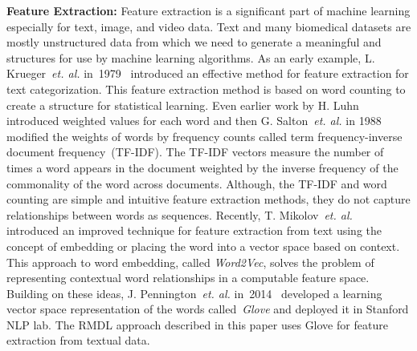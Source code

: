 \documentclass[sigconf, final]{acmart}
\begin{document}
\textbf{Feature Extraction:}\label{subsec:related1}
Feature extraction is a significant part of machine learning especially for text, image, and video data. %
 Text and many biomedical datasets are mostly unstructured data from which we need to generate a meaningful and structures for use by machine learning algorithms. As an early example, L. Krueger~\textit{et. al.} in~1979~\cite{krueger1979letter} introduced an effective method for feature extraction for text categorization. This feature extraction method is based on word counting to create a structure for statistical learning. Even earlier work by H. Luhn~\cite{luhn1957statistical} introduced weighted values for each word and then G. Salton~\textit{et. al.} in 1988~\cite{salton1988term} modified the weights of words by frequency counts called term frequency-inverse document frequency~(TF-IDF). The TF-IDF vectors measure the number of times a word appears in the document weighted by the inverse frequency of the commonality of the word across documents. Although, the TF-IDF and word counting are simple and intuitive feature extraction methods, they do not capture relationships between words as sequences. Recently, T. Mikolov~\textit{et. al.}~\cite{mikolov2013efficient} introduced an improved technique for feature extraction from text using the concept of embedding or placing the word into a vector space based on context.  This approach to word embedding, called \textit{Word2Vec}, solves the problem of %
 representing contextual word relationships in a computable feature space. Building on these ideas, J. Pennington~\textit{et. al.} in~2014~\cite{pennington2014glove} developed a learning vector space representation of the words called~\textit{Glove} and deployed it in Stanford NLP lab. The RMDL approach described in this paper uses Glove for feature extraction from textual data.
\end{document}
